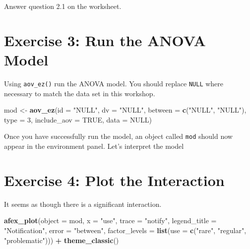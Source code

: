 \documentclass[
]{book}
\newenvironment{Shaded}{\begin{snugshade}}{\end{snugshade}}
\newcommand{\AttributeTok}[1]{\textcolor[rgb]{0.13,0.29,0.53}{#1}}
\newcommand{\ConstantTok}[1]{\textcolor[rgb]{0.56,0.35,0.01}{#1}}
\newcommand{\DecValTok}[1]{\textcolor[rgb]{0.00,0.00,0.81}{#1}}
\newcommand{\FunctionTok}[1]{\textcolor[rgb]{0.13,0.29,0.53}{\textbf{#1}}}
\newcommand{\NormalTok}[1]{#1}
\newcommand{\OtherTok}[1]{\textcolor[rgb]{0.56,0.35,0.01}{#1}}
\newcommand{\SpecialCharTok}[1]{\textcolor[rgb]{0.81,0.36,0.00}{\textbf{#1}}}
\newcommand{\StringTok}[1]{\textcolor[rgb]{0.31,0.60,0.02}{#1}}
\let\oldsection\section
\renewcommand{\section}{\needspace{5\baselineskip}\oldsection}
\begin{document}
Answer question 2.1 on the worksheet.

\section{Exercise 3: Run the ANOVA Model}\label{exercise-3-run-the-anova-model}

Using \texttt{aov\_ez()} run the ANOVA model. You should replace \texttt{NULL} where necessary to match the data set in this workshop.

\begin{Shaded}
\begin{Highlighting}[]
\NormalTok{mod }\OtherTok{\textless{}{-}} \FunctionTok{aov\_ez}\NormalTok{(}\AttributeTok{id =} \StringTok{"NULL"}\NormalTok{,}
              \AttributeTok{dv =} \StringTok{"NULL"}\NormalTok{,}
              \AttributeTok{between =} \FunctionTok{c}\NormalTok{(}\StringTok{"NULL"}\NormalTok{, }\StringTok{"NULL"}\NormalTok{),}
              \AttributeTok{type =} \DecValTok{3}\NormalTok{,}
              \AttributeTok{include\_aov =} \ConstantTok{TRUE}\NormalTok{,}
              \AttributeTok{data =} \ConstantTok{NULL}\NormalTok{)}
\end{Highlighting}
\end{Shaded}

Once you have successfully run the model, an object called \texttt{mod} should now appear in the environment panel. Let's interpret the model

\begin{Shaded}
\end{Shaded}

\section{Exercise 4: Plot the Interaction}\label{exercise-4-plot-the-interaction}

It seems as though there is a significant interaction.

\begin{Shaded}
\begin{Highlighting}[]
\FunctionTok{afex\_plot}\NormalTok{(}\AttributeTok{object =}\NormalTok{ mod, }
          \AttributeTok{x =} \StringTok{"use"}\NormalTok{, }
          \AttributeTok{trace =} \StringTok{"notify"}\NormalTok{,}
          \AttributeTok{legend\_title =} \StringTok{"Notification"}\NormalTok{,}
          \AttributeTok{error =} \StringTok{"between"}\NormalTok{,}
          \AttributeTok{factor\_levels =} \FunctionTok{list}\NormalTok{(}\AttributeTok{use =} \FunctionTok{c}\NormalTok{(}\StringTok{"rare"}\NormalTok{, }\StringTok{"regular"}\NormalTok{, }\StringTok{"problematic"}\NormalTok{))) }\SpecialCharTok{+} 
  \FunctionTok{theme\_classic}\NormalTok{()}
\end{Highlighting}
\end{Shaded}
\end{document}
